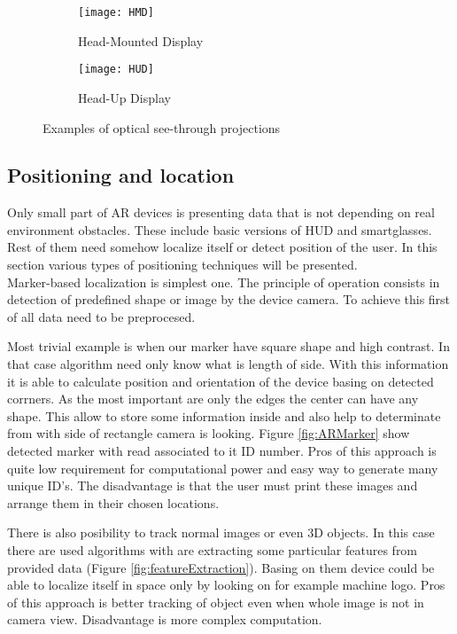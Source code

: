 \documentclass[printmode,en]{mgr}
\begin{document}
\begin{figure}[!ht]
\centering
\begin{subfigure}{.5\textwidth}
  \centering
  \texttt{[image: HMD]}
  \caption{Head-Mounted Display}
  \label{fig:headMounted}
\end{subfigure}%
\begin{subfigure}{.5\textwidth}
  \centering
  \texttt{[image: HUD]}
  \caption{Head-Up Display}
  \label{fig:headUp}
\end{subfigure}
\caption{Examples of optical see-through projections}
\label{fig:seeThroughAR}
\end{figure}

\subsection{Positioning and location}
Only small part of AR devices is presenting data that is not depending on real environment obstacles. These include basic versions of HUD and smartglasses. Rest of them need somehow localize itself or detect position of the user. In this section various types of positioning techniques will be presented.\\

Marker-based localization is simplest one. The principle of operation consists in detection of predefined shape or image by the device camera. To achieve this first of all data need to be preprocesed.

Most trivial example is when our marker have square shape and high contrast. In that case algorithm need only know what is length of side. With this information it is able to calculate position and orientation of the device basing on detected corrners. As the most important are only the edges the center can have any shape. This allow to store some information inside and also help to determinate from with side of rectangle camera is looking. Figure \ref{fig:ARMarker} show detected marker with read associated to it ID number. Pros of this approach is quite low requirement for computational power and easy way to generate many unique ID's. The disadvantage is that the user must print these images and arrange them in their chosen locations.

There is also posibility to track normal images or even 3D objects. In this case there are used algorithms with are extracting some particular features from provided data (Figure \ref{fig:featureExtraction}). Basing on them device could be able to localize itself in space only by looking on for example machine logo. Pros of this approach is better tracking of object even when whole image is not in camera view. Disadvantage is more complex computation.
\end{document}
